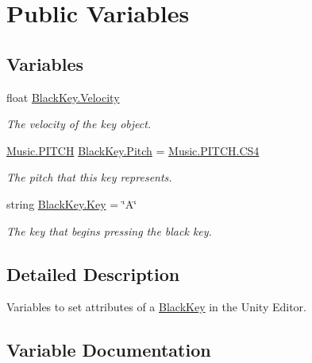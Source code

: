 \hypertarget{group___black_key_pub_var}{}\section{Public Variables}
\label{group___black_key_pub_var}
\subsection*{Variables}
\begin{DoxyCompactItemize}
\item 
float \hyperlink{group___black_key_pub_var_ga6fb983b09b3b6f80eab375fcb43010c1}{Black\+Key.\+Velocity}
\begin{DoxyCompactList}\small\item\em The velocity of the key object. \end{DoxyCompactList}\item 
\hyperlink{group___music_enums_ga508f69b199ea518f935486c990edac1d}{Music.\+P\+I\+T\+CH} \hyperlink{group___black_key_pub_var_gad233c456182c9cef7c01486484940439}{Black\+Key.\+Pitch} = \hyperlink{group___music_enums_gga508f69b199ea518f935486c990edac1da7009daf81333670cd06b8bb2b02054cc}{Music.\+P\+I\+T\+C\+H.\+C\+S4}
\begin{DoxyCompactList}\small\item\em The pitch that this key represents. \end{DoxyCompactList}\item 
string \hyperlink{group___black_key_pub_var_gaa541d3fb6cbb1361d5c062ce7b3c4e29}{Black\+Key.\+Key} = \char`\"{}A\char`\"{}
\begin{DoxyCompactList}\small\item\em The key that begins pressing the black key. \end{DoxyCompactList}\end{DoxyCompactItemize}


\subsection{Detailed Description}
Variables to set attributes of a \hyperlink{class_black_key}{Black\+Key} in the Unity Editor. 

\subsection{Variable Documentation}
\mbox{\label{group___black_key_pub_var_gaa541d3fb6cbb1361d5c062ce7b3c4e29}} 
